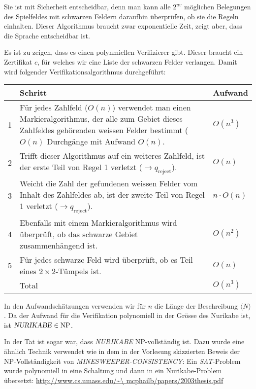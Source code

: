 \begin{loesung}
Sie ist mit Sicherheit entscheidbar, denn man kann alle $2^{uv}$
möglichen Belegungen des Spielfeldes mit schwarzen Feldern daraufhin
überprüfen, ob sie die Regeln einhalten. Dieser Algorithmus braucht
zwar exponentielle Zeit, zeigt aber, dass die Sprache entscheidbar ist.

Es ist zu zeigen, dass es einen polynmiellen Verifizierer gibt. Dieser
braucht ein Zertifikat $c$, für welches wir eine Liste der schwarzen
Felder verlangen. Damit wird folgender Verifikationsalgorithmus
durchgeführt:

\begin{tabular}{rll}
&Schritt&Aufwand\\
\hline
1&\begin{minipage}[t]{4.2truein}\strut
Für jedes Zahlfeld ($O(n)$) verwendet man einen Markieralgorithmus,
der alle zum Gebiet dieses Zahlfeldes gehörenden weissen
Felder bestimmt ($O(n)$ Durchgänge mit Aufwand
$O(n)$.\strut\end{minipage}&$O(n^3)$\\
2&\begin{minipage}[t]{4.2truein}\strut
Trifft dieser Algorithmus auf ein weiteres
Zahlfeld, ist der erste Teil von Regel 1 verletzt
($\to q_{\text{reject}}$).
\strut\end{minipage}&$O(n)$\\
3&\begin{minipage}[t]{4.2truein}\strut
Weicht die Zahl der gefundenen weissen Felder vom Inhalt des Zahlfeldes
ab, ist der zweite Teil von Regel 1 verletzt
($\to q_{\text{reject}}$).\strut\end{minipage}&$n\cdot O(n)$\\
4&\begin{minipage}[t]{4.2truein}\strut
Ebenfalls mit einem Markieralgorithmus wird überprüft, ob das
schwarze Gebiet zusammenhängend ist.
\strut\end{minipage}&$O(n^2)$\\
5&\begin{minipage}[t]{4.2truein}\strut
Für jedes schwarze Feld wird überprüft, ob es Teil eines
$2\times 2$-Tümpels ist.
\strut\end{minipage}&$O(n)$\\
\hline
&Total&$O(n^3)$
\end{tabular}

In den Aufwandschätzungen verwenden wir für $n$ die Länge der
Beschreibung $\langle N\rangle$. Da der Aufwand für die Verifikation
polynomiell in der Grösse des Nurikabe ist, ist
$\text{\textsl{NURIKABE}}\in\operatorname{NP}$.

In der Tat ist sogar war, dass \textsl{NURIKABE} NP-vollständig
ist. Dazu wurde eine ähnlich Technik verwendet wie in dem in
der Vorlesung skizzierten Beweis
der NP-Vollständigkeit von \textsl{MINESWEEPER-CONSISTENCY}:
Ein \textsl{SAT}-Problem wurde polynomiell in eine Schaltung und dann in
ein Nurikabe-Problem übersetzt:
\url{http://www.cs.umass.edu/\~\ mcphailb/papers/2003thesis.pdf}
\end{loesung}
